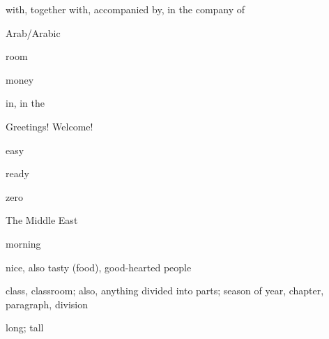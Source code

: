 \begin{flashcard}{\LARGE with, together with, accompanied by, in the company of}
\LARGE {}
\end{flashcard}
\begin{flashcard}{\LARGE Arab/Arabic}
\LARGE {}
\end{flashcard}
\begin{flashcard}{\LARGE room}
\LARGE {}
\end{flashcard}
\begin{flashcard}{\LARGE money}
\LARGE {}
\end{flashcard}
\begin{flashcard}{\LARGE in, in the}
\LARGE {}
\end{flashcard}
\begin{flashcard}{\LARGE Greetings! Welcome!}
\LARGE {}
\end{flashcard}
\begin{flashcard}{\LARGE easy}
\LARGE {}
\end{flashcard}
\begin{flashcard}{\LARGE ready}
\LARGE {}
\end{flashcard}
\begin{flashcard}{\LARGE zero}
\LARGE {}
\end{flashcard}
\begin{flashcard}{\LARGE The Middle East}
\LARGE {}
\end{flashcard}
\begin{flashcard}{\LARGE morning}
\LARGE {}
\end{flashcard}
\begin{flashcard}{\LARGE nice, also tasty (food), good-hearted people}
\LARGE {}
\end{flashcard}
\begin{flashcard}{\LARGE class, classroom; also, anything divided into parts; season of year, chapter, paragraph, division}
\LARGE {}
\end{flashcard}
\begin{flashcard}{\LARGE long; tall}
\LARGE {}
\end{flashcard}

